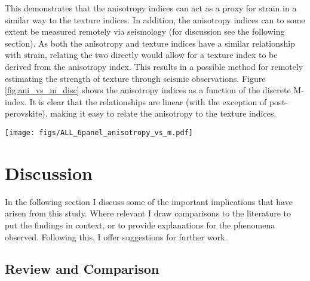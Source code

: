 \documentclass[a4paper,12pt,twoside]{report}
\numberwithin{equation}{chapter}
\begin{document}
This demonstrates that the anisotropy indices can act as a proxy for strain in a similar way to the texture indices. In addition, the anisotropy indices can to some extent be measured remotely via seismology (for discussion see the following section). As both the anisotropy and texture indices have a similar relationship with strain, relating the two directly would allow for a texture index to be derived from the anisotropy index. This results in a possible method for remotely estimating the strength of texture through seismic observations. Figure \ref{fig:ani_vs_m_disc} shows the anisotropy indices as a function of the discrete M-index. It is clear that the relationships are linear (with the exception of post-perovskite), making it easy to relate the anisotropy to the texture indices. 

\begin{figure*}[p]
  \centering
    \texttt{[image: figs/ALL\_6panel\_anisotropy\_vs\_m.pdf]}
  \caption[Relationship of anisotropy indices and M-index (disc)]{Seismic anisotropy measures, the Universal Elastic Anisotropy Index (uA) and the \cite{Ledbetter2006} index (lmA) as a function of the discrete M-index. \textbf{Top row} shows data from olivine VPSC models, \textbf{middle row} shows quartz, and \textbf{bottom row} shows post-perovskite. \textbf{Right column} shows data from axial compression models and \textbf{left column} shows data from simple shear models. All calculations use $n$ = 10,000 grains.} 
  \label{fig:ani_vs_m_disc}
\end{figure*} 
 
\chapter{Discussion} \label{chap:discussion}
\vspace{-1cm}
In the following section I discuss some of the important implications that have arisen from this study. Where relevant I draw comparisons to the literature to put the findings in context, or to provide explanations for the phenomena observed. Following this, I offer suggestions for further work.


\section{Review and Comparison} \label{sec:diss_results_comp}
\end{document}

